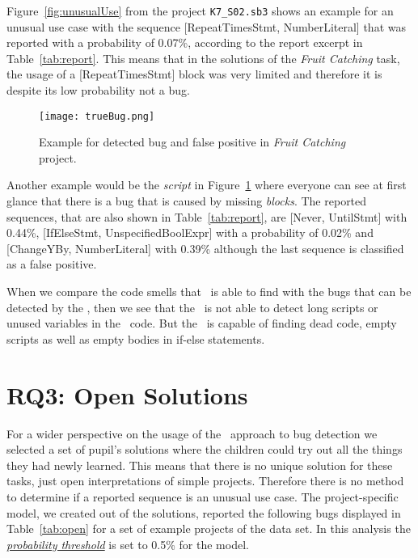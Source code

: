 Figure~\ref{fig:unusualUse} from the project \texttt{K7\_S02.sb3} shows an example for an unusual use case with the sequence [RepeatTimesStmt, NumberLiteral] that was reported with a probability of 0.07\%, according to the report excerpt in Table~\ref{tab:report}. This means that in the solutions of the \textit{Fruit Catching} task, the usage of a [RepeatTimesStmt] block was very limited and therefore it is despite its low probability not a bug.  

\begin{figure}[H]
    \centering
    \texttt{[image: trueBug.png]}
    \caption[Example for detected bug and false positive in \textit{Fruit Catching} project]{\label{fig:trueBug}Example for detected bug and false positive in \textit{Fruit Catching} project.}
\end{figure}

Another example would be the \textit{script} in Figure~\ref{fig:trueBug} where everyone can see at first glance that there is a bug that is caused by missing \textit{blocks}. The reported sequences, that are also shown in Table~\ref{tab:report}, are [Never, UntilStmt] with 0.44\%, [IfElseStmt, UnspecifiedBoolExpr] with a probability of 0.02\% and [ChangeYBy, NumberLiteral] with 0.39\% although the last sequence is classified as a false positive. 

When we compare the code smells that \litterbox\ is able to find with the bugs that can be detected by the \ngram{}, then we see that the \ngram\ is not able to detect long scripts or unused variables in the \scratch\ code. But the \ngram\ is capable of finding dead code, empty scripts as well as empty bodies in if-else statements. 
 

\section{RQ3: Open Solutions}\label{sec:open}
For a wider perspective on the usage of the \ngram\ approach to bug detection we selected a set of pupil's solutions where the children could try out all the things they had newly learned. This means that there is no unique solution for these tasks, just open interpretations of simple projects. Therefore there is no method to determine if a reported sequence is an unusual use case. The project-specific model, we created out of the solutions, reported the following bugs displayed in Table~\ref{tab:open} for a set of example projects of the data set. In this analysis the \hyperref[def:probability_threshold]{\textit{probability threshold}} is set to 0.5\% for the model. 

